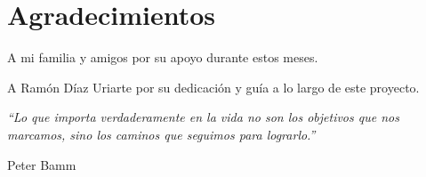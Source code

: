\chapter*{Agradecimientos}

A mi familia y amigos por su apoyo durante estos meses.

A Ramón Díaz Uriarte por su dedicación y guía a lo largo de este proyecto.

\begin{flushright}
\textit{``Lo que importa verdaderamente en la vida no son los objetivos que nos marcamos, sino los caminos que seguimos para lograrlo.''}

Peter Bamm
\end{flushright}
